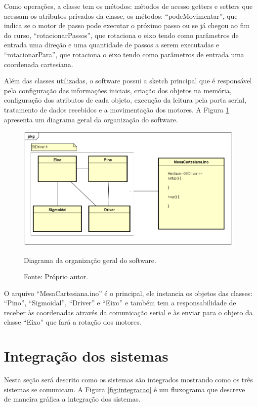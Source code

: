 Como operações, a classe tem os métodos: métodos de acesso getters e setters que acessam os atributos 
privados da classe, os métodos: “podeMovimentar”, que indica se o motor de passo pode executar o próximo 
passo ou se já chegou ao fim do curso, “rotacionarPassos”, que rotaciona o eixo tendo como parâmetros de 
entrada uma direção e uma quantidade de passos a serem executadas e “rotacionarPara”, que rotaciona o 
eixo tendo como parâmetros de entrada uma coordenada cartesiana.

Além das classes utilizadas, o software possui a sketch principal que é responsável pela configuração das 
informações iniciais, criação dos objetos na memória, configuração dos atributos de cada objeto, execução 
da leitura pela porta serial, tratamento de dados recebidos e a movimentação dos motores.
A Figura \ref{fig:orgsoftware} apresenta um diagrama geral da organização do software.

\begin{figure}[H]
\centering
\includegraphics[width = 1\linewidth]{figuras/orgsoftware}
\caption{Diagrama da organização geral do software.}
\caption*{Fonte: Próprio autor.}
\label{fig:orgsoftware}
\end{figure}
    
O arquivo “MesaCartesiana.ino” é o principal, ele instancia os objetos das classes: “Pino”, “Sigmoidal”, 
“Driver” e “Eixo” e também tem a responsabilidade de receber às coordenadas através da comunicação serial 
e às enviar para o objeto da classe “Eixo” que fará a rotação dos motores.

\section{Integração dos sistemas}\label{subsec:metintegracao}

Nesta seção será descrito como os sistemas são integrados mostrando como os três sistemas se comunicam. 
A Figura \ref{fig:integracao} é um fluxograma que descreve de maneira gráfica a integração dos sistemas.

